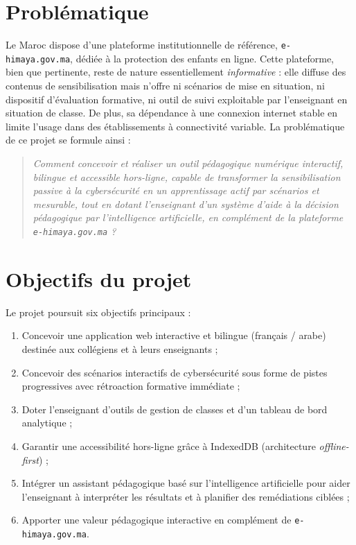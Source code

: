 \documentclass[12pt, a4paper, oneside]{report}
\begin{document}
\section*{Problématique}
Le Maroc dispose d'une plateforme institutionnelle de référence, \texttt{e-himaya.gov.ma}, dédiée à la protection des enfants en ligne. Cette plateforme, bien que pertinente, reste de nature essentiellement \textit{informative} : elle diffuse des contenus de sensibilisation mais n'offre ni scénarios de mise en situation, ni dispositif d'évaluation formative, ni outil de suivi exploitable par l'enseignant en situation de classe. De plus, sa dépendance à une connexion internet stable en limite l'usage dans des établissements à connectivité variable. La problématique de ce projet se formule ainsi :

\begin{quote}
\textit{Comment concevoir et réaliser un outil pédagogique numérique interactif, bilingue et accessible hors-ligne, capable de transformer la sensibilisation passive à la cybersécurité en un apprentissage actif par scénarios et mesurable, tout en dotant l'enseignant d'un système d'aide à la décision pédagogique par l'intelligence artificielle, en complément de la plateforme \texttt{e-himaya.gov.ma} ?}
\end{quote}

\section*{Objectifs du projet}
Le projet poursuit six objectifs principaux :
\begin{enumerate}[leftmargin=*]
  \item Concevoir une application web interactive et bilingue (français / arabe) destinée aux collégiens et à leurs enseignants ;
  \item Concevoir des scénarios interactifs de cybersécurité sous forme de pistes progressives avec rétroaction formative immédiate ;
  \item Doter l'enseignant d'outils de gestion de classes et d'un tableau de bord analytique ;
  \item Garantir une accessibilité hors-ligne grâce à IndexedDB (architecture \textit{offline-first}) ;
  \item Intégrer un assistant pédagogique basé sur l'intelligence artificielle pour aider l'enseignant à interpréter les résultats et à planifier des remédiations ciblées ;
  \item Apporter une valeur pédagogique interactive en complément de \texttt{e-himaya.gov.ma}.
\end{enumerate}
\end{document}
